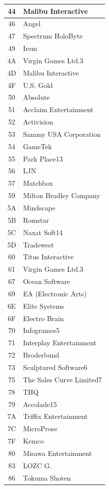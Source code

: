 \begin{longtable}{|c|l|}
44 & Malibu Interactive \\\hline
46 & Angel \\\hline
47 & Spectrum HoloByte \\\hline
49 & Irem \\\hline
4A & Virgin Games Ltd.3 \\\hline
4D & Malibu Interactive \\\hline
4F & U.S. Gold \\\hline
50 & Absolute \\\hline
51 & Acclaim Entertainment \\\hline
52 & Activision \\\hline
53 & Sammy USA Corporation \\\hline
54 & GameTek \\\hline
55 & Park Place13 \\\hline
56 & LJN \\\hline
57 & Matchbox \\\hline
59 & Milton Bradley Company \\\hline
5A & Mindscape \\\hline
5B & Romstar \\\hline
5C & Naxat Soft14 \\\hline
5D & Tradewest \\\hline
60 & Titus Interactive \\\hline
61 & Virgin Games Ltd.3 \\\hline
67 & Ocean Software \\\hline
69 & EA (Electronic Arts) \\\hline
6E & Elite Systems \\\hline
6F & Electro Brain \\\hline
70 & Infogrames5 \\\hline
71 & Interplay Entertainment \\\hline
72 & Broderbund \\\hline
73 & Sculptured Software6 \\\hline
75 & The Sales Curve Limited7 \\\hline
78 & THQ \\\hline
79 & Accolade15 \\\hline
7A & Triffix Entertainment \\\hline
7C & MicroProse \\\hline
7F & Kemco \\\hline
80 & Misawa Entertainment \\\hline
83 & LOZC G. \\\hline
86 & Tokuma Shoten \\\hline

\end{longtable}
